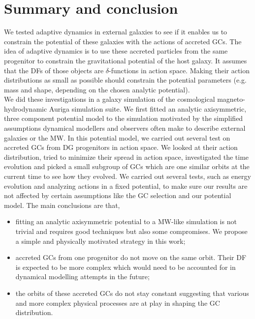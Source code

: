 \section{Summary and conclusion}\label{sec:sumconc}
We tested adaptive dynamics in external galaxies to see if it enables us to constrain the potential of these galaxies with the actions of accreted \acp{GC}. The idea of adaptive dynamics is to use these accreted particles from the same progenitor to constrain the gravitational potential of the host galaxy. It assumes that the \acp{DF} of those objects are $\delta$-functions in action space. Making their action distributions as small as possible should constrain the potential parameters (e.g. mass and shape, depending on the chosen analytic potential). 
\\We did these investigations in a galaxy simulation of the cosmological magneto-hydrodynamic Auriga simulation suite. We first fitted an analytic axisymmetric, three component potential model to the simulation motivated by the simplified assumptions dynamical modellers and observers often make to describe external galaxies or the \ac{MW}. In this potential model, we carried out several test on accreted \acp{GC} from \ac{DG} progenitors in action space. We looked at their action distribution, tried to minimize their spread in action space, investigated the time evolution and picked a small subgroup of \acp{GC} which are one similar orbits at the current time to see how they evolved. We carried out several tests, such as energy evolution and analyzing actions in a fixed potential, to make sure our results are not affected by certain assumptions like the \ac{GC} selection and our potential model. The main conclusions are that,
\begin{itemize}
    \item fitting an analytic axisymmetric potential to a \ac{MW}-like simulation is not trivial and requires good techniques but also some compromises. We propose a simple and physically motivated strategy in this work;
    \item accreted \acp{GC} from one progenitor do not move on the same orbit. Their \ac{DF} is expected to be more complex which would need to be accounted for in dynamical modelling attempts in the future;
    \item the orbits of these accreted \acp{GC} do not stay constant suggesting that various and more complex physical processes are at play in shaping the \ac{GC} distribution.
\end{itemize}

